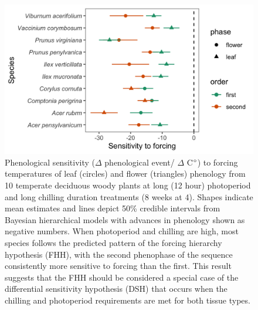 \documentclass[11pt]{article}\usepackage[]{graphicx}\usepackage[]{color}
\begin{document}
\begin{figure}[h!]
    \centering
         \includegraphics[width=\textwidth]{..//Plots/Flobuds_manuscript_figs/PHH_plot.png} 
    \caption{Phenological sensitivity ($\Delta$ phenological event/ $\Delta$ C$\degree$) to forcing temperatures of leaf (circles) and flower (triangles) phenology from 10 temperate deciduous woody plants at long (12 hour) photoperiod and long chilling duration treatments (8 weeks at 4\degree ). Shapes indicate mean estimates and lines depict 50\% credible intervals from Bayesian hierarchical models with advances in phenology shown as negative numbers. When photoperiod and chilling are high, most species follows the predicted pattern of the forcing hierarchy hypothesis (FHH), with the second phenophase of the sequence consistently more sensitive to forcing than the first. This result suggests that the FHH should be considered a special case of the differential sensitivity hypothesis (DSH) that occurs when the chilling and photoperiod requirements are met for both tissue types.}
    \label{fig:FHH}
\end{figure}
\end{document}
